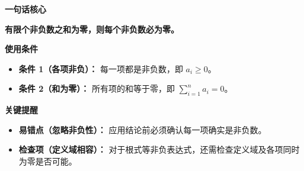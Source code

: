 \begin{summarybox}
	\textbf{\textcolor{CSummary}{一句话核心}}

	\textbf{有限个非负数之和为零，则每个非负数必为零。}

	\medskip
	\textbf{\textcolor{CSummary}{使用条件}}
	\begin{itemize}[leftmargin=*, itemsep=0.5em, topsep=0.4em]
		\item \textbf{条件 1（各项非负）：} 每一项都是非负数，即 $a_i\ge0$。
		\item \textbf{条件 2（和为零）：} 所有项的和等于零，即 $\sum_{i=1}^n a_i=0$。
	\end{itemize}

	\medskip
	\textbf{\textcolor{CSummary}{关键提醒}}
	\begin{itemize}[leftmargin=*, itemsep=0.5em, topsep=0.4em]
		\item \textbf{易错点（忽略非负性）：} 应用结论前必须确认每一项确实是非负数。
		\item \textbf{检查项（定义域相容）：} 对于根式等非负表达式，还需检查定义域及各项同时为零是否可能。
	\end{itemize}
\end{summarybox}